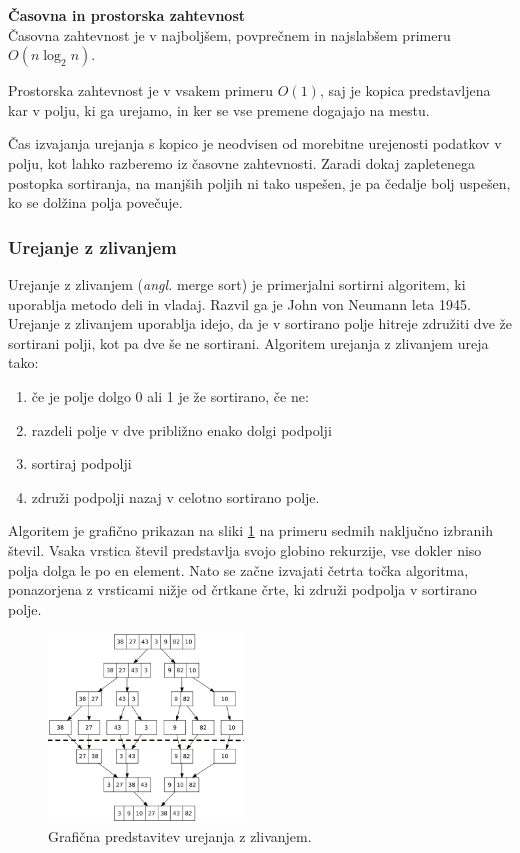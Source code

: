 \documentclass[a4paper,oneside]{article}
\begin{document}
\textbf{Časovna in prostorska zahtevnost} \\
Časovna zahtevnost je v najboljšem, povprečnem in najslabšem primeru $O(n\log_2 n)$.

Prostorska zahtevnost je v vsakem primeru $O(1)$, saj je kopica predstavljena kar v
polju, ki ga urejamo, in ker se vse premene dogajajo na mestu.

Čas izvajanja urejanja s kopico je neodvisen od morebitne urejenosti podatkov v polju,
kot lahko razberemo iz časovne zahtevnosti. Zaradi dokaj zapletenega postopka sortiranja,
na manjših poljih ni tako uspešen, je pa čedalje bolj uspešen, ko se dolžina polja
povečuje.

\subsubsection{Urejanje z zlivanjem}
\label{chapter:mergesort}
Urejanje z zlivanjem (\emph{angl.} merge sort) je primerjalni sortirni algoritem, ki
uporablja metodo deli in vladaj. Razvil ga je John von Neumann leta 1945.
Urejanje z zlivanjem uporablja idejo, da je v sortirano polje hitreje združiti dve že
sortirani polji, kot pa dve še ne sortirani. 
Algoritem urejanja z zlivanjem ureja tako:
\begin{enumerate}
  \item če je polje dolgo 0 ali 1 je že sortirano, če ne:
  \item razdeli polje v dve približno enako dolgi podpolji
  \item sortiraj podpolji 
  \item združi podpolji nazaj v celotno sortirano polje.
\end{enumerate}

Algoritem je grafično prikazan na sliki \ref{fig:mergesortimage} na primeru sedmih
naključno izbranih števil.
Vsaka vrstica števil predstavlja svojo globino rekurzije, vse dokler niso polja dolga le
po en element. Nato se začne izvajati četrta točka algoritma, ponazorjena z vrsticami
nižje od črtkane črte, ki združi podpolja v sortirano polje.

\begin{figure}[h]
    \begin{center}
        \includegraphics[height=50mm]{slike/merge_sort.png}
    \end{center}
    \vspace{-0.7cm}
    \caption{Grafična predstavitev urejanja z zlivanjem.}
    \label{fig:mergesortimage}
\end{figure}
\end{document}
